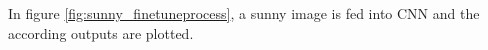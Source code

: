 In figure \ref{fig:sunny_finetuneprocess}, a sunny image is fed into CNN and the according outputs are plotted.

\begin{figure}[!htb]
    \centering
\end{figure}
